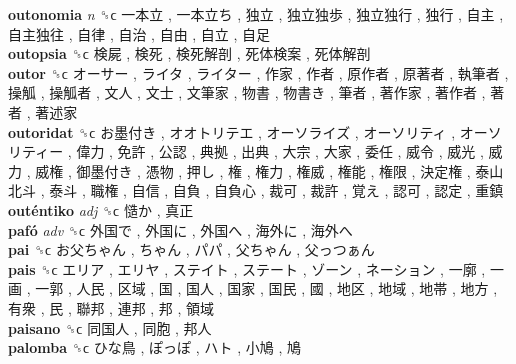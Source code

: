 \textbf{outonomia} \emph{n}  ␝ϲ   一本立 ,  一本立ち ,  独立 ,  独立独歩 ,  独立独行 ,  独行 ,  自主 ,  自主独往 ,  自律 ,  自治 ,  自由 ,  自立 ,  自足   \\
\textbf{outopsia} ␝ϲ   検屍 ,  検死 ,  検死解剖 ,  死体検案 ,  死体解剖   \\
\textbf{outor} ␝ϲ   オーサー ,  ライタ ,  ライター ,  作家 ,  作者 ,  原作者 ,  原著者 ,  執筆者 ,  操觚 ,  操觚者 ,  文人 ,  文士 ,  文筆家 ,  物書 ,  物書き ,  筆者 ,  著作家 ,  著作者 ,  著者 ,  著述家   \\
\textbf{outoridat} ␝ϲ   お墨付き ,  オオトリテエ ,  オーソライズ ,  オーソリティ ,  オーソリティー ,  偉力 ,  免許 ,  公認 ,  典拠 ,  出典 ,  大宗 ,  大家 ,  委任 ,  威令 ,  威光 ,  威力 ,  威権 ,  御墨付き ,  憑物 ,  押し ,  権 ,  権力 ,  権威 ,  権能 ,  権限 ,  決定権 ,  泰山北斗 ,  泰斗 ,  職権 ,  自信 ,  自負 ,  自負心 ,  裁可 ,  裁許 ,  覚え ,  認可 ,  認定 ,  重鎮   \\
\textbf{outéntiko} \emph{adj}  ␝ϲ   慥か ,  真正   \\
\textbf{pafó} \emph{adv}  ␝ϲ   外国で ,  外国に ,  外国へ ,  海外に ,  海外へ   \\
\textbf{pai} ␝ϲ   お父ちゃん ,  ちゃん ,  パパ ,  父ちゃん ,  父っつぁん   \\
\textbf{pais} ␝ϲ   エリア ,  エリヤ ,  ステイト ,  ステート ,  ゾーン ,  ネーション ,  一廓 ,  一画 ,  一郭 ,  人民 ,  区域 ,  国 ,  国人 ,  国家 ,  国民 ,  國 ,  地区 ,  地域 ,  地帯 ,  地方 ,  有衆 ,  民 ,  聯邦 ,  連邦 ,  邦 ,  領域   \\
\textbf{paisano} ␝ϲ   同国人 ,  同胞 ,  邦人   \\
\textbf{palomba} ␝ϲ   ひな鳥 ,  ぽっぽ ,  ハト ,  小鳩 ,  鳩   \\
